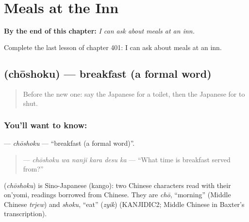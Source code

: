 
\chapter{Meals at the Inn}
\label{ch:ja-meals-at-the-inn}

\begin{chapteropening}
\textbf{By the end of this chapter:} \emph{I can ask about meals at an inn.}

Complete the last lesson of chapter 401: I can ask about meals at an inn.
\end{chapteropening}

\section[\texorpdfstring{\ja{ちょうしょく} (chōshoku)}{ちょうしょく (chōshoku)}]{ (chōshoku) — breakfast (a formal word)}

\label{lesson:JA-C401-choushoku}



\begin{quote}
Before the new one: say the Japanese for a toilet, then the Japanese for to shut.
\end{quote}

\subsection*{You'll want to know: }
\textbf{} — \emph{chōshoku} — \textquotedblleft{}breakfast (a formal word)\textquotedblright{}.

\begin{quote}
\textbf{ } — \emph{chōshoku wa nanji kara desu ka} — \textquotedblleft{}What time is breakfast served from?\textquotedblright{}
\end{quote}

\begin{cousinweb}
\textbf{} (\emph{chōshoku}) is Sino-Japanese (kango): two Chinese characters read with their on'yomi, readings borrowed from Chinese. They are \emph{chō}, \textquotedblleft{}morning\textquotedblright{} (Middle Chinese \emph{trjew}) and \emph{shoku}, \textquotedblleft{}eat\textquotedblright{} (\emph{zyik}) (KANJIDIC2; Middle Chinese in Baxter's transcription).
\end{cousinweb}

